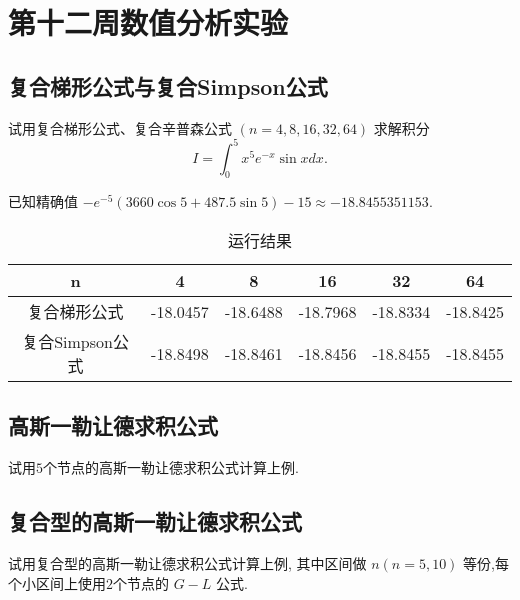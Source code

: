 \section{第十二周数值分析实验}
\subsection{复合梯形公式与复合Simpson公式}
\begin{ex}
	试用复合梯形公式、复合辛普森公式 $(n=4,8,16,32,64)$ 求解积分
	$$
	I=\int_0^5 x^5 e^{-x} \sin x d x.
	$$
	
	已知精确值 $-e^{-5}(3660 \cos 5+487.5 \sin 5)-15 \approx-18.8455351153$.
\end{ex}

\qa 
\begin{table}[H]
	\centering
	\caption{运行结果}
	\begin{tabular}{c|ccccc}
		n     & 4     & 8     & 16    & 32    & 64 \\
		\hline
		复合梯形公式 & -18.0457 & -18.6488 & -18.7968 & -18.8334 & -18.8425 \\
		复合Simpson公式 & -18.8498 & -18.8461 & -18.8456 & -18.8455 & -18.8455 \\
	\end{tabular}%
	\label{tab:addlabel12}%
\end{table}%

\subsection{高斯一勒让德求积公式}
\begin{ex}
	试用$5$个节点的高斯一勒让德求积公式计算上例.
\end{ex}

\subsection{复合型的高斯一勒让德求积公式}
\begin{ex}
	试用复合型的高斯一勒让德求积公式计算上例, 其中区间做 $n(n=5,10)$ 等份,每个小区间上使用$2$个节点的 $G-L$ 公式.
\end{ex}

\qa [-18.8454781687866,-18.8455360298194]